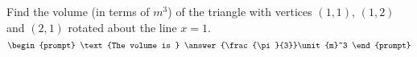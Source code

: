 \documentclass{ximera}
\author{Gregory Hartman \and Matthew Carr}
\begin{document}
\begin{exercise}






Find the volume (in terms of $\unit{m}^3$) of the triangle with vertices $(1,1)$, $(1,2)$ and $(2,1)$ rotated about the line $x=1$.
\[
\begin{prompt}
\text{The volume is } \answer{\frac{\pi}{3}}\unit{m}^3
\end{prompt}
\]




\end{exercise}
\end{document}
